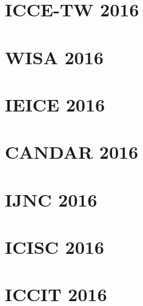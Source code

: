 \documentclass[
11pt, %
english, %
doublespacing %
liststotoc, %
toctotoc, %
parskip, %
headsepline, %
consistentlayout, %
]{MastersDoctoralThesis} %
\makeatletter
\newcommand{\extraPartText}[1]{\def\@extraPartText{#1}}
\makeatother
\begin{document}

\mainmatter %

\pagestyle{thesis} %


 
% 
\chapter{ICCE-TW 2016} 

\chapter{WISA 2016} 
 
\chapter{IEICE 2016} 
 
\chapter{CANDAR 2016} 
 
\chapter{IJNC 2016}

\chapter{ICISC 2016} 
 
\chapter{ICCIT 2016} 

\end{document}
